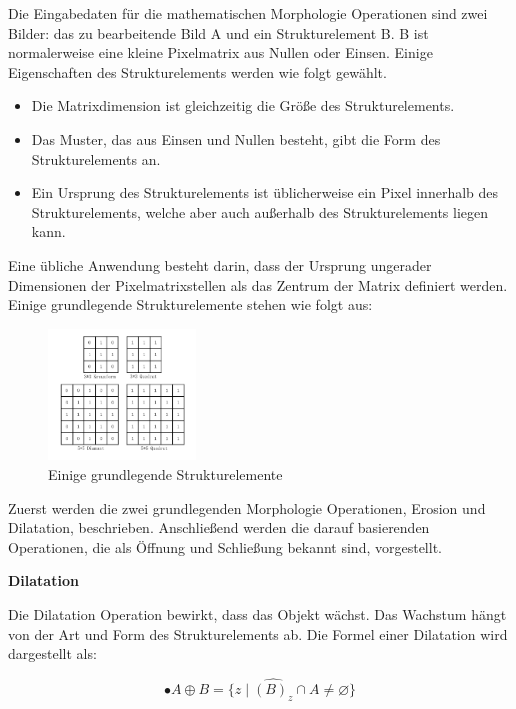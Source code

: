 Die Eingabedaten für die mathematischen Morphologie Operationen sind zwei Bilder: das zu bearbeitende Bild A und ein Strukturelement B. B ist normalerweise eine kleine Pixelmatrix aus Nullen oder Einsen. Einige Eigenschaften des Strukturelements werden wie folgt gewählt.

\begin{itemize}
\item Die Matrixdimension ist gleichzeitig die Größe des Strukturelements.
\item Das Muster, das aus Einsen und Nullen besteht, gibt die Form des Strukturelements an.
\item Ein Ursprung des Strukturelements ist üblicherweise ein Pixel innerhalb des Strukturelements, welche aber auch außerhalb des Strukturelements liegen kann. 
\end{itemize}

Eine übliche Anwendung besteht darin, dass der Ursprung ungerader Dimensionen der Pixelmatrixstellen als das Zentrum der Matrix definiert werden. Einige grundlegende Strukturelemente stehen wie folgt aus:

\begin{figure}[H]
 \centering 
  \includegraphics[keepaspectratio,width=0.35\textwidth]{images/4_ZweiteErfahrung/Morphological/strelement.pdf}
 \caption{Einige grundlegende Strukturelemente}
 \label{fig:Strukturelemente}
\end{figure} 

Zuerst werden die zwei grundlegenden Morphologie Operationen, Erosion und Dilatation, beschrieben. Anschließend werden die darauf basierenden Operationen, die als Öffnung und Schließung bekannt sind, vorgestellt.

\textbf{Dilatation}

Die Dilatation Operation bewirkt, dass das Objekt wächst. Das Wachstum hängt von der Art und Form des Strukturelements ab. Die Formel einer Dilatation wird dargestellt als:

\begin{equation}
•A \oplus B =\lbrace z \mid \widehat{(B)_z} \cap A \ne \varnothing \rbrace  
\end{equation}

